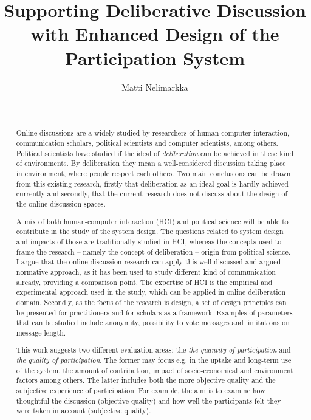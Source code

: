 \documentclass{article}
\date{~}
\author{\textsf{Matti Nelimarkka}}
\title{\textsf{Supporting Deliberative Discussion with Enhanced Design of the Participation System}}
\begin{document}
\maketitle
\thispagestyle{empty}

\begin{abstract}

Online discussions are a widely studied by researchers of human-computer interaction, communication scholars, political scientists and computer scientists, among others. Political scientists have studied if the ideal of \textit{deliberation} can be achieved in these kind of environments. By deliberation they mean a well-considered discussion taking place in environment, where people respect each others. Two main conclusions can be drawn from this existing research, firstly that deliberation as an ideal goal is hardly achieved currently and secondly, that the current research does not discuss about the design of the online discussion spaces.

A mix of both human-computer interaction (HCI) and political science will be able to contribute in the study of the system design. The questions related to system design and impacts of those are traditionally studied in HCI, whereas the concepts used to frame the research -- namely the concept of deliberation -- origin from political science. I argue that the online discussion research can apply this well-discussed and argued normative approach, as it has been used to study different kind of communication already, providing a comparison point. The expertise of HCI is the empirical and experimental approach used in the study, which can be applied in online deliberation domain. Secondly, as the focus of the research is design, a set of design principles can be presented for practitioners and for scholars as a framework. Examples of parameters that can be studied include anonymity, possibility to vote messages and limitations on message length.

This work suggests two different evaluation areas: the \textit{the quantity of participation} and \textit{the quality of participation}. The former may focus e.g. in the uptake and long-term use of the system, the amount of contribution, impact of socio-economical and environment factors among others. The latter includes both the more objective quality and the subjective experience of participation. For example, the aim is to examine how thoughtful the discussion (objective quality) and how well the participants felt they were taken in account (subjective quality).
\end{abstract}
\end{document}

